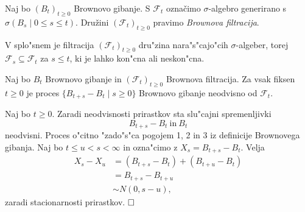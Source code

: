 \documentclass[twoside,11pt]{article}
\begin{document}
%



\begin{definicija}
    Naj bo $(B_t)_{t\geq 0}$ Brownovo gibanje. S $\mathcal{F}_t$ 
    označimo $\sigma$-algebro generirano s $\sigma(B_s \mid 0\leq s \leq t)$. 
    Družini $(\mathcal{F}_t)_{t\geq 0}$ pravimo \textit{Brownova filtracija}.
\end{definicija}

\begin{opomba}
    V splo"snem je filtracija $(\mathcal{F}_t)_{t\geq0}$ dru"zina nara"s"cajo"cih $\sigma$-algeber, torej $\mathcal{F}_s \subseteq \mathcal{F}_t$ za $s \leq t$, ki je lahko kon"cna ali neskon"cna.
\end{opomba}
 

\begin{izrek}
    Naj bo $B_t$ Brownovo gibanje in $(\mathcal{F}_t)_{t\geq 0}$ Brownova filtracija. Za vsak fiksen $t \geq 0$  je proces $\{B_{t+s}-B_t\mid s\geq 0\}$ Brownovo gibanje neodvisno od $\mathcal{F}_t$.
\end{izrek}

\begin{dokaz}
    Naj bo $t \geq 0$. Zaradi neodvisnosti prirastkov sta slu"cajni spremenljivki 
    $$
    B_{t+s}-B_t \ \text{in} \ B_t
    $$
    neodvisni. Proces o"citno "zado"s"ca pogojem 1, 2 in 3 iz definicije Brownovega gibanja. Naj bo $t \leq u < s < \infty$ in ozna"cimo z $X_s = B_{t+s}-B_t$. Velja
    \begin{align*}
        X_s - X_u &= (B_{t + s} - B_t) + (B_{t + u} - B_t) \\        
                  &= B_{t + s} - B_{t + u} \\
                  &\sim N(0, s-u), 
    \end{align*}
    zaradi stacionarnosti prirastkov.
    $\hfill \square$
\end{dokaz}
\end{document}
